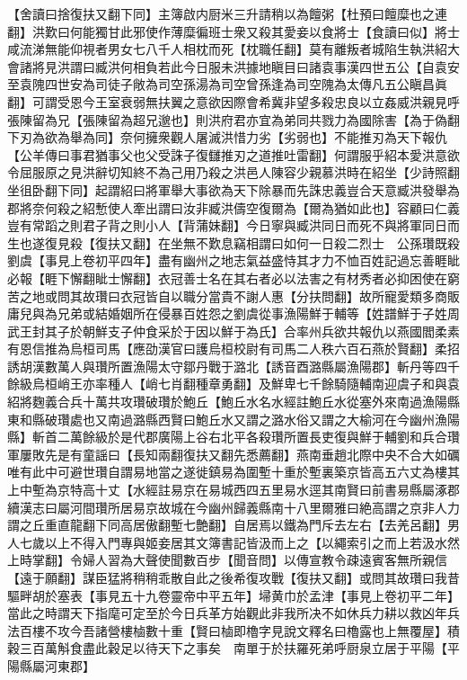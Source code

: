【舍讀曰捨復扶又翻下同】主簿啟内厨米三升請稍以為饘粥【杜預曰饘糜也之連翻】洪歎曰何能獨甘此邪使作薄糜徧班士衆又殺其愛妾以食將士【食讀曰似】將士咸流涕無能仰視者男女七八千人相枕而死【枕職任翻】莫有離叛者城陷生執洪紹大會諸將見洪謂曰臧洪何相負若此今日服未洪據地瞋目曰諸袁事漢四世五公【自袁安至袁隗四世安為司徒子敞為司空孫湯為司空曾孫逢為司空隗為太傳凡五公瞋昌眞翻】可謂受恩今王室衰弱無扶翼之意欲因際會希冀非望多殺忠良以立姦威洪親見呼張陳留為兄【張陳留為超兄邈也】則洪府君亦宜為弟同共戮力為國除害【為于偽翻下刃為欲為舉為同】奈何擁衆觀人屠滅洪惜力劣【劣弱也】不能推刃為天下報仇【公羊傳曰事君猶事父也父受誅子復讎推刃之道推吐雷翻】何謂服乎紹本愛洪意欲令屈服原之見洪辭切知終不為己用乃殺之洪邑人陳容少親慕洪時在紹坐【少詩照翻坐徂卧翻下同】起謂紹曰將軍舉大事欲為天下除暴而先誅忠義豈合天意臧洪發舉為郡將奈何殺之紹慙使人牽出謂曰汝非臧洪儔空復爾為【爾為猶如此也】容顧曰仁義豈有常蹈之則君子背之則小人【背蒲妹翻】今日寧與臧洪同日而死不與將軍同日而生也遂復見殺【復扶又翻】在坐無不歎息竊相謂曰如何一日殺二烈士　公孫瓚既殺劉虞【事見上卷初平四年】盡有幽州之地志氣益盛恃其才力不恤百姓記過忘善睚眦必報【睚下懈翻眦士懈翻】衣冠善士名在其右者必以法害之有材秀者必抑困使在窮苦之地或問其故瓚曰衣冠皆自以職分當貴不謝人惠【分扶問翻】故所寵愛類多商販庸兒與為兄弟或結婚姻所在侵暴百姓怨之劉虞從事漁陽鮮于輔等【姓譜鮮于子姓周武王封其子於朝鮮支子仲食采於于因以鮮于為氏】合率州兵欲共報仇以燕國閻柔素有恩信推為烏桓司馬【應劭漢官曰護烏桓校尉有司馬二人秩六百石燕於賢翻】柔招誘胡漢數萬人與瓚所置漁陽太守鄒丹戰于潞北【誘音酉潞縣屬漁陽郡】斬丹等四千餘級烏桓峭王亦率種人【峭七肖翻種章勇翻】及鮮卑七千餘騎隨輔南迎虞子和與袁紹將麴義合兵十萬共攻瓚破瓚於鮑丘【鮑丘水名水經註鮑丘水從塞外來南過漁陽縣東和縣破瓚處也又南過潞縣西賢曰鮑丘水又謂之潞水俗又謂之大榆河在今幽州漁陽縣】斬首二萬餘級於是代郡廣陽上谷右北平各殺瓚所置長吏復與鮮于輔劉和兵合瓚軍屢敗先是有童謡曰【長知兩翻復扶又翻先悉薦翻】燕南垂趙北際中央不合大如礪唯有此中可避世瓚自謂易地當之遂徙鎮易為圍塹十重於塹裏築京皆高五六丈為樓其上中塹為京特高十丈【水經註易京在易城西四五里易水逕其南賢曰前書易縣屬涿郡續漢志曰屬河間瓚所居易京故城在今幽州歸義縣南十八里爾雅曰絶高謂之京非人力謂之丘重直龍翻下同高居傲翻塹七艶翻】自居焉以鐵為門斥去左右【去羌呂翻】男人七歲以上不得入門專與姬妾居其文簿書記皆汲而上之【以繩索引之而上若汲水然上時掌翻】令婦人習為大聲使聞數百步【聞音問】以傳宣教令疎遠賓客無所親信【遠于願翻】謀臣猛將稍稍乖散自此之後希復攻戰【復扶又翻】或問其故瓚曰我昔驅畔胡於塞表【事見五十九卷靈帝中平五年】埽黄巾於孟津【事見上卷初平二年】當此之時謂天下指麾可定至於今日兵革方始觀此非我所决不如休兵力耕以救凶年兵法百樓不攻今吾諸營樓樐數十重【賢曰樐即櫓字見說文釋名曰櫓露也上無覆屋】積穀三百萬斛食盡此穀足以待天下之事矣　南單于於扶羅死弟呼厨泉立居于平陽【平陽縣屬河東郡】

